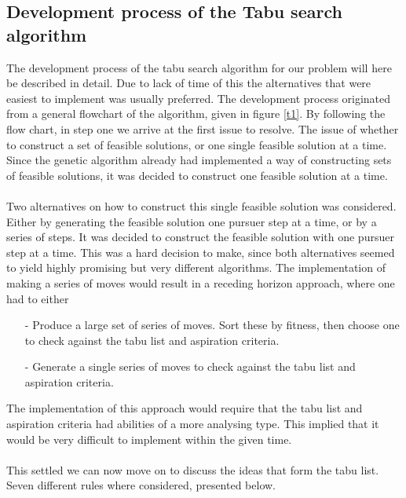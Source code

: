 \subsection{Development process of the Tabu search algorithm}
The development process of the tabu search algorithm for our problem will here be described in detail. Due to lack of time of this the alternatives that were easiest to implement was usually preferred. The development process originated from a general flowchart of the algorithm, given in figure \ref{t1}. By following the flow chart, in step one we arrive at the first issue to resolve. The issue of whether to construct a set of feasible solutions, or one single feasible solution at a time. Since the genetic algorithm already had implemented a way of constructing sets of feasible solutions, it was decided to construct one feasible solution at a time.\\
\\
Two alternatives on how to construct this single feasible solution was considered. Either by generating the feasible solution one pursuer step at a time, or by a series of steps. It was decided to construct the feasible solution with one pursuer step at a time. This was a hard decision to make, since both alternatives seemed to yield highly promising but very different algorithms. The implementation of making a series of moves would result in a receding horizon approach, where one had to either  
\begin{itemize}
\item[-]{}Produce a large set of series of moves. Sort these by fitness, then choose one to check against the tabu list and aspiration criteria.
\item[-]{}Generate a single series of moves to check against the tabu list and aspiration criteria.
\end{itemize}
The implementation of this approach would require that the tabu list and aspiration criteria had abilities of a more analysing type. This implied that it would be very difficult to implement within the given time.\\
\\This settled we can now move on to discuss the ideas that form the tabu list. Seven different rules where considered, presented below.
